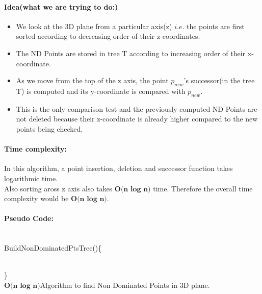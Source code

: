 \documentclass[pdftex,a4paper,12pt]{report}
\begin{document}
\paragraph{Idea(what we are trying to do:)}
\begin{itemize}
 \item 
We look at the 3D plane from a particular axis(z) $i.e.$ the points are first sorted according to decreasing order of their z-coordinates.
\item
The ND Points are stored in tree T according to increasing order of their x-coordinate.
\item
As we move from the top of the z axis, the point $p_{new}$’s successor(in the tree T) is computed and its y-coordinate is compared with $p_{new}$.
\item
This is the only comparison test and the previously computed ND Points are not deleted 
because their z-coordinate is already higher compared to the new points being checked.
\end{itemize}

\paragraph{Time complexity:}
In this algorithm, a point insertion, deletion and successor function takes logarithmic time.\\
Also sorting aross z axis also takes $\textbf{O(n log n)} $ time. Therefore the overall time complexity would be $\textbf{O(n log n)}$.
\newpage

\paragraph{Pseudo Code:} \makebox[2pt]{}\\
BuildNonDominatedPtsTree()\{
\begin{algorithm}
\makebox[2pt]{}\\
\}\\
\caption{$\textbf{O(n log n)}$Algorithm to find Non Dominated Points in 3D plane.}
\end{algorithm}
\newpage
\end{document}
